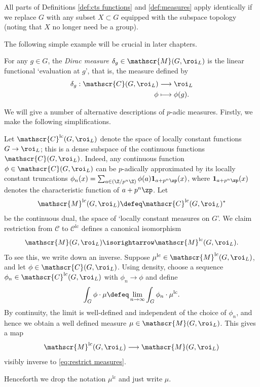 \documentclass[a4paper,10pt, english, reqno]{smfart}
\newcommand{\sM}{\mathscr{M}}
\newcommand{\sC}{\mathscr{C}}
\numberwithin{equation}{section}
\begin{document}
\begin{remark}
All parts of Definitions \ref{def:cts functions} and \ref{def:measures} apply identically if we replace $G$ with any subset $X \subset G$ equipped with the subspace topology (noting that $X$ no longer need be a group).
\end{remark}


The following simple example will be crucial in later chapters.
\begin{example}\label{ex:dirac}
For any $g \in G$, the \emph{Dirac measure} $\delta_g \in \mathscr{M}(G,\roi_L)$ is the linear functional `evaluation at $g$', that is, the measure defined by
\begin{align*} \delta_g : \mathscr{C}(G,\roi_L) &\longrightarrow \roi_L\\
\phi &\longmapsto \phi(g).
\end{align*}
\end{example}

We will give a number of alternative descriptions of $p$-adic measures. Firstly, we make the following simplifications.
\begin{remark}\label{rem:locally constant}
Let $\sC^{\mathrm{lc}}(G,\roi_L)$ denote the space of locally constant functions $G \to \roi_L$; this is a dense subspace of the continuous functions $\sC(G,\roi_L)$. Indeed, any continuous function $\phi \in \mathscr{C}(G, \roi_L)$ can be $p$-adically approximated by its locally constant truncations $\phi_n(x) = \sum_{a \in (\Z / p^n \Z)} \phi(a) \mathbf{1}_{a + p^n \zp}(x)$, where $\mathbf{1}_{a + p^n \zp}(x)$ denotes the characteristic function of $a + p^n \zp$. Let 
\[
    \sM^{\mathrm{lc}}(G,\roi_L) \defeq \sC^{\mathrm{lc}}(G,\roi_L)^*
\]
be the continuous dual, the space of `locally constant measures on $G$'. We claim restriction from $\sC$ to $\sC^{\mathrm{lc}}$ defines a canonical isomorphism
\begin{equation}\label{eq:restrict measures}
    \sM(G,\roi_L) \isorightarrow \sM^{\mathrm{lc}}(G,\roi_L).
\end{equation}
To see this, we write down an inverse. Suppose $\mu^{\mathrm{lc}} \in \sM^{\mathrm{lc}}(G,\roi_L)$, and let $\phi \in \sC(G,\roi_L)$. Using density, choose a sequence $\phi_n \in \sC^{\mathrm{lc}}(G,\roi_L)$ with $\phi_n \to \phi$ and define
\[
    \int_G \phi \cdot \mu \defeq \lim_{n\to \infty} \int_G\phi_n\cdot \mu^{\mathrm{lc}}.
\]
By continuity, the limit is well-defined and independent of the choice of $\phi_n$, and hence we obtain a well defined measure $\mu \in \sM(G,\roi_L)$. This gives a map
\[
    \sM^{\mathrm{lc}}(G,\roi_L) \longrightarrow \sM(G,\roi_L)
\]
visibly inverse to \eqref{eq:restrict measures}.

Henceforth we drop the notation $\mu^{\mathrm{lc}}$ and just write $\mu$.
\end{remark}
\end{document}
